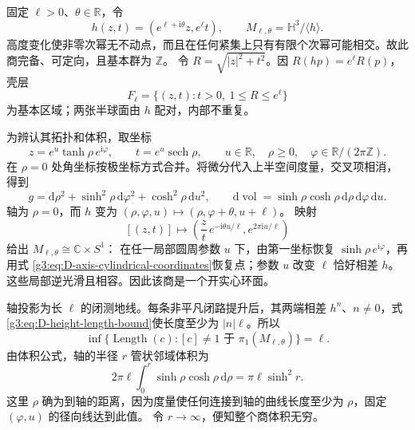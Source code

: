 \begin{example}\label{g3:exm:D-loxodromic-solid-torus}
	固定 \(\ell>0\)、\(\theta\in\mathbb R\)，令
	\[
		h(z,t)=(e^{\ell+\mathrm i\theta}z,e^\ell t),
		\qquad M_{\ell,\theta}=\mathbb H^3/\langle h\rangle.
	\]
	高度变化使非零次幂无不动点，而且在任何紧集上只有有限个次幂可能相交。故此商完备、可定向，且基本群为 \(\mathbb Z\)。
	令 \(R=\sqrt{|z|^2+t^2}\)。因 \(R(hp)=e^\ell R(p)\)，壳层
	\[
		F_\ell=\{(z,t):t>0,\ 1\le R\le e^\ell\}
	\]
	为基本区域；两张半球面由 \(h\) 配对，内部不重复。

	为辨认其拓扑和体积，取坐标
	\begin{equation}\label{g3:eq:D-axis-cylindrical-coordinates}
		z=e^u\tanh\rho\,e^{\mathrm i\varphi},\qquad
		t=e^u\operatorname{sech}\rho,\qquad
		u\in\mathbb R,\quad\rho\ge0,\quad
		\varphi\in\mathbb R/(2\pi\mathbb Z).
	\end{equation}
	在 \(\rho=0\) 处角坐标按极坐标方式合并。将微分代入上半空间度量，交叉项相消，得到
	\begin{equation}\label{g3:eq:D-axis-cylindrical-metric}
		g=\mathrm d\rho^2+\sinh^2\rho\,\mathrm d\varphi^2
		             +\cosh^2\rho\,\mathrm du^2,\qquad
		\mathrm d\operatorname{vol}
		    =\sinh\rho\cosh\rho\,\mathrm d\rho\,\mathrm d\varphi\,\mathrm du.
	\end{equation}
	轴为 \(\rho=0\)，而 \(h\) 变为
	\((\rho,\varphi,u)\mapsto(\rho,\varphi+\theta,u+\ell)\)。
	映射
	\[
		[(z,t)]\longmapsto
		\left(\frac zt\,e^{-\mathrm i\theta u/\ell},
		               e^{2\pi\mathrm iu/\ell}\right)
	\]
	给出 \(M_{\ell,\theta}\cong\mathbb C\times S^1\)：
	在任一局部圆周参数 \(u\) 下，由第一坐标恢复
	\(\sinh\rho\,e^{\mathrm i\varphi}\)，再用式
	\eqref{g3:eq:D-axis-cylindrical-coordinates}恢复点；参数 \(u\) 改变
	\(\ell\) 恰好相差 \(h\)。这些局部逆光滑且相容。因此该商是一个开实心环面。

	轴投影为长 \(\ell\) 的闭测地线。每条非平凡闭路提升后，其两端相差
	\(h^n\)、\(n\ne0\)，式\eqref{g3:eq:D-height-length-bound}使长度至少为
	\(|n|\ell\)。所以
	\begin{equation}\label{g3:eq:D-cyclic-systole}
		\inf\{\operatorname{Length}(c):[c]\ne1\text{ 于 }\pi_1(M_{\ell,\theta})\}
		    =\ell.
	\end{equation}
	由体积公式，轴的半径 \(r\) 管状邻域体积为
	\begin{equation}\label{g3:eq:D-cyclic-tube-volume}
		2\pi\ell\int_0^r\sinh\rho\cosh\rho\,\mathrm d\rho
		    =\pi\ell\sinh^2r.
	\end{equation}
	这里 \(\rho\) 确为到轴的距离，因为度量使任何连接到轴的曲线长度至少为
	\(\rho\)，固定 \((\varphi,u)\) 的径向线达到此值。
	令 \(r\to\infty\)，便知整个商体积无穷。


\end{example}
